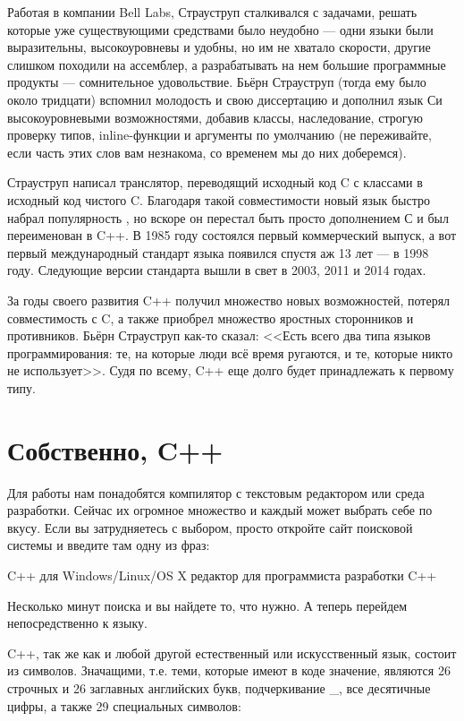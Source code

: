 \documentclass{article}
\begin{document}
Работая в компании Bell Labs, Страуструп сталкивался с задачами, решать которые уже существующими средствами было неудобно --- одни языки были выразительны, высокоуровневы и удобны, но им не хватало скорости, другие слишком походили на ассемблер, а разрабатывать на нем большие программные продукты --- сомнительное удовольствие. Бьёрн Страуструп (тогда ему было около тридцати) вспомнил молодость и свою диссертацию и дополнил язык Си высокоуровневыми возможностями, добавив классы, наследование, строгую проверку типов, inline-функции и аргументы по умолчанию (не переживайте, если часть этих слов вам незнакома, со временем мы до них доберемся).

Страуструп написал транслятор, переводящий исходный код C с классами в исходный код чистого C. Благодаря такой совместимости новый язык быстро набрал популярность , но вскоре он перестал быть просто дополнением С и был переименован в C++. В 1985 году состоялся первый коммерческий выпуск, а вот первый международный стандарт языка появился спустя аж 13 лет --- в 1998 году. Следующие версии стандарта вышли в свет в 2003, 2011 и 2014 годах.

За годы своего развития C++ получил множество новых возможностей, потерял совместимость с C, а также приобрел множество яростных сторонников и противников. Бьёрн Страуструп как-то сказал: <<Есть всего два типа языков программирования: те, на которые люди всё время ругаются, и те, которые никто не использует>>. Судя по всему, C++ еще долго будет принадлежать к первому типу.

\section*{Собственно, C++}

Для работы нам понадобятся компилятор с текстовым редактором или среда разработки. Сейчас их огромное множество и каждый может выбрать себе по вкусу. Если вы затрудняетесь с выбором, просто откройте сайт поисковой системы и введите там одну из фраз:

\begin{itemize}
 C++ для Windows/Linux/OS X
 редактор для программиста
 разработки C++
\end{itemize}

Несколько минут поиска и вы найдете то, что нужно. А теперь перейдем непосредственно к языку.

C++, так же как и любой другой естественный или искусственный язык, состоит из символов. Значащими, т.е. теми, которые имеют в коде значение, являются 26 строчных и 26 заглавных английских букв, подчеркивание \_, все десятичные цифры, а также 29 специальных символов: 
\end{document}
